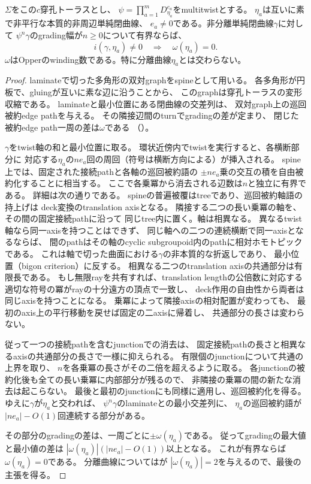 \begin{lemma}[multitwistによるgrading幅の増大]
\label{lem:ou-nodal-winding-drift}
$\Sigma$をこの$c$穿孔トーラスとし、
$\psi=\prod_{a=1}^m D_{\eta_a}^{e_a}$をmultitwistとする。
$\eta_a$は互いに素で非平行な本質的非周辺単純閉曲線、
$e_a\ne0$である。非分離単純閉曲線$\gamma$に対して
$\psi^n\gamma$のgrading幅が$n\geq0$について有界ならば、
\[
 i(\gamma,\eta_a)\ne0\quad\Longrightarrow\quad
 \omega(\eta_a)=0.
\]
$\omega$はOpperのwinding数である。特に分離曲線$\eta_a$とは交わらない。
\end{lemma}
\begin{proof}
laminateで切った多角形の双対graphをspineとして用いる。
各多角形が円板で、gluingが互いに素な辺に沿うことから、
このgraphは穿孔トーラスの変形収縮である。
laminateと最小位置にある閉曲線の交差列は、
双対graph上の巡回被約edge pathを与える。
その隣接辺間のturnでgradingの差が定まり、
閉じた被約edge path一周の差は$\omega$である
（\cite[Sections~4.2.2--4.3]{Opper2026}）。

$\gamma$をtwist軸の和と最小位置に取る。
環状近傍内でtwistを実行すると、各横断部分に
対応する$\eta_a$の$ne_a$回の周回（符号は横断方向による）が挿入される。
spine上では、固定された接続pathと各軸の巡回被約語の
$\pm ne_a$乗の交互の積を自由被約化することに相当する。
ここで各乗冪から消去される辺数は$n$と独立に有界である。
詳細は次の通りである。
spineの普遍被覆はtreeであり、巡回被約軸語の持上げは
deck変換のtranslation axisとなる。
隣接する二つの長い乗冪の軸を、その間の固定接続pathに沿って
同じtree内に置く。軸は相異なる。
異なるtwist軸なら同一axisを持つことはできず、
同じ軸への二つの連続横断で同一axisとなるならば、
間のpathはその軸のcyclic subgroupoid内のpathに相対ホモトピックである。
これは軸で切った曲面における$\gamma$の非本質的な折返しであり、
最小位置（bigon criterion）に反する。
相異なる二つのtranslation axisの共通部分は有限長である。
もし無限rayを共有すれば、translation lengthの公倍数に対応する
適切な符号の冪がrayの十分遠方の頂点で一致し、
deck作用の自由性から両者は同じaxisを持つことになる。
乗冪によって隣接axisの相対配置が変わっても、
最初のaxis上の平行移動を戻せば固定の二axisに帰着し、
共通部分の長さは変わらない。

従って一つの接続pathを含むjunctionでの消去は、
固定接続pathの長さと相異なるaxisの共通部分の長さで一様に抑えられる。
有限個のjunctionについて共通の上界を取り、
$n$を各乗冪の長さがその二倍を超えるように取る。
各junctionの被約化後も全ての長い乗冪に内部部分が残るので、
非隣接の乗冪の間の新たな消去は起こらない。
最後と最初のjunctionにも同様に適用し、巡回被約化を得る。
ゆえに$\gamma$が$\eta_a$と交われば、
$\psi^n\gamma$のlaminateとの最小交差列に、
$\eta_a$の巡回被約語が$|ne_a|-O(1)$回連続する部分がある。

その部分のgradingの差は、一周ごとに$\pm\omega(\eta_a)$である。
従ってgradingの最大値と最小値の差は
$|\omega(\eta_a)|(|ne_a|-O(1))$以上となる。
これが有界ならば$\omega(\eta_a)=0$である。
分離曲線については\cite[Lemma~5.3]{Opper2026}が
$|\omega(\eta_a)|=2$を与えるので、最後の主張を得る。
\end{proof}

